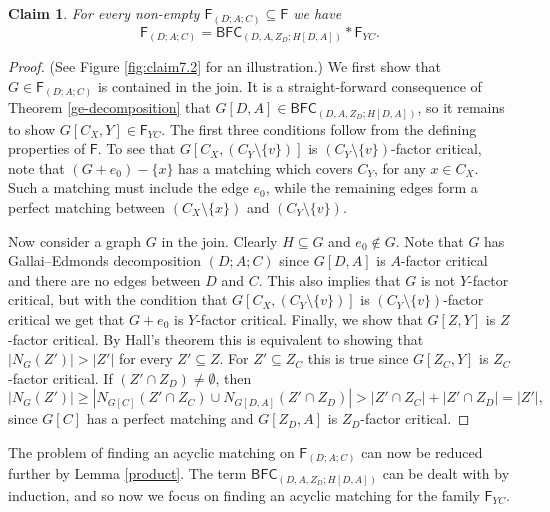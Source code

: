 \documentclass[10pt]{amsart}
\newtheorem{claim}[thm]{Claim}
\theoremstyle{definition}
\begin{document}
	\begin{claim} \label{size BFC DAC} For every non-empty $\mathsf{F}_{(D;A;C)} \subseteq \mathsf{F}$ we have
		\[\mathsf{F}_{(D;A;C)} = \mathsf{BFC}_{(D,A,Z_D; H[D,A])} * \mathsf{F}_{YC}.\]
	\end{claim}
	\begin{proof} (See Figure \ref{fig:claim7.2} for an illustration.) We first show that $G\in \mathsf{F}_{(D;A;C)}$ is contained in the join. It is a straight-forward consequence of Theorem \ref{ge-decomposition}  that $G[D,A] \in \mathsf{BFC}_{(D,A,Z_D; H[D,A])}$, so it remains to show $G[C_X, Y] \in \mathsf{F}_{YC}$. The first three conditions follow from the  defining properties of $\mathsf{F}$.
		To see that $G[C_X, (C_Y\setminus \{v\})]$ is $(C_Y\setminus\{v\})$-factor critical, note that
		$(G+e_0) - \{x\}$ has a matching which covers $C_Y$, for any $x\in C_X$. Such a matching must include the edge $e_0$, while the remaining edges form a perfect matching between $(C_X\setminus\{x\})$ and $(C_Y\setminus \{v\})$.
		
		Now consider a graph $G$ in the join. Clearly $H\subseteq G$ and $e_0\notin G$. 
		Note that $G$ has Gallai--Edmonds decomposition $(D;A;C)$ since $G[D,A]$ is $A$-factor critical and there are no edges between $D$ and $C$.
		This also implies that $G$ is not $Y$-factor critical, but with the condition that $G[C_X, (C_Y\setminus \{v\})]$ is $(C_Y\setminus\{v\})$-factor critical we get that $G+e_0$ is $Y$-factor critical. 
		Finally, we show that $G[Z,Y]$ is $Z$-factor critical. 
		By Hall's theorem this is equivalent to showing that $|N_G(Z')|>|Z'|$ for every $Z'\subseteq Z$. 
		For $Z'\subseteq Z_C$ this is true since $G[Z_C, Y]$ is $Z_C$-factor critical. If $(Z'\cap Z_D) \neq \emptyset$, then \[|N_G(Z')| \geq  |N_{G[C]}(Z'\cap Z_C) \cup N_{G[D,A]}(Z'\cap Z_D)| > |Z'\cap Z_C| + |Z'\cap Z_D| = |Z'|,\] since $G[C]$ has a perfect matching and $G[Z_D,A]$ is $Z_D$-factor critical. 
	\end{proof}
	
	The problem of finding an acyclic matching on $\mathsf{F}_{(D;A;C)}$ can now be reduced further by Lemma \ref{product}. 
	The term $\mathsf{BFC}_{(D,A,Z_D;H[D,A])}$ can be dealt with by induction, and so now we focus on finding an acyclic matching for the family $\mathsf{F}_{YC}$.
	
	\medskip
	
\end{document}

